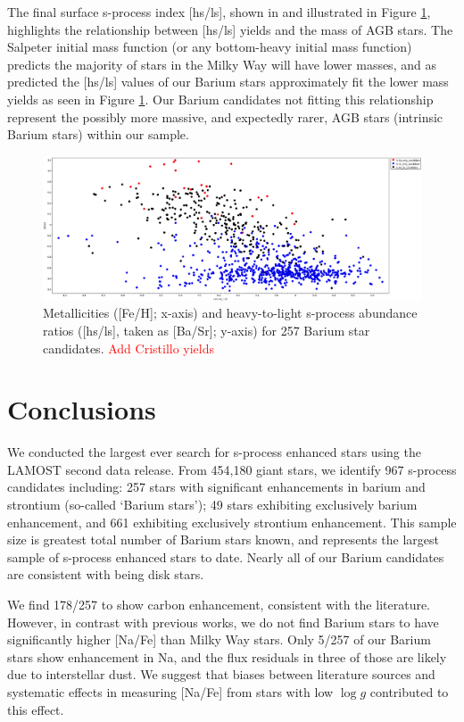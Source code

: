 \documentclass[a4paper,fleqn,usenatbib]{mnras}
\newcommand{\todo}[1]{\textcolor{red}{#1}}
\begin{document}
The final surface s-process index [hs/ls], shown in \citet{cristallo2015} and illustrated in Figure \ref{fig:figure3}, highlights the relationship between [hs/ls] yields and the mass of AGB stars. The Salpeter initial mass function (or any bottom-heavy initial mass function) predicts the majority of stars in the Milky Way will have lower masses, and as predicted the [hs/ls] values of our Barium stars approximately fit the lower mass yields as seen in Figure \ref{fig:figure3}. Our Barium candidates not fitting this relationship represent the possibly more massive, and expectedly rarer, AGB stars (intrinsic Barium stars) within our sample.

\begin{figure}
	\includegraphics[width=\columnwidth]{basrtest4.png}
    \caption{Metallicities ([Fe/H]; x-axis) and heavy-to-light s-process abundance ratios ([hs/ls], taken as [Ba/Sr]; y-axis) for 257 Barium star candidates. \todo{Add Cristillo yields}}
    \label{fig:figure3}
\end{figure}


\section{Conclusions} \label{sec:con}

We conducted the largest ever search for s-process enhanced stars using the LAMOST second data release. From 454,180 giant stars, we identify 967 s-process candidates including: 257 stars with significant enhancements in barium and strontium (so-called `Barium stars'); 49 stars exhibiting exclusively barium enhancement, and 661 exhibiting exclusively strontium enhancement. This sample size is greatest total number of Barium stars known, and represents the largest sample of s-process enhanced stars to date. Nearly all of our Barium candidates are consistent with being disk stars. 

We find 178/257 to show carbon enhancement, consistent with the literature. However, in contrast with previous works, we do not find Barium stars to have significantly higher [Na/Fe] than Milky Way stars. Only 5/257 of our Barium stars show enhancement in Na, and the flux residuals in three of those are likely due to interstellar dust. We suggest that biases between literature sources and systematic effects in measuring [Na/Fe] from stars with low $\log{g}$ contributed to this effect. 
\end{document}
